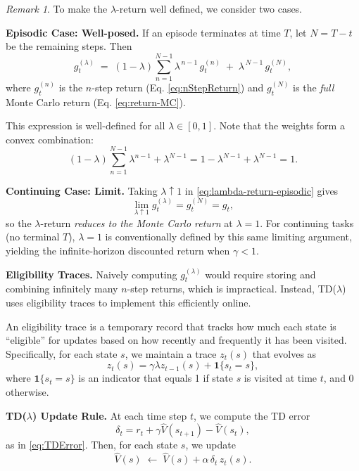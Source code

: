 \documentclass[
]{book}
\theoremstyle{definition}
\theoremstyle{definition}
\theoremstyle{definition}
\theoremstyle{definition}
\theoremstyle{remark}
\newtheorem*{remark}{Remark}
\begin{document}
\begin{remark}
To make the \(\lambda\)-return well defined, we consider two cases.

\textbf{Episodic Case: Well-posed.} If an episode terminates at time \(T\), let \(N=T-t\) be the remaining steps. Then
\begin{equation}
g_t^{(\lambda)}
\;=\;
(1-\lambda)\sum_{n=1}^{N-1}\lambda^{\,n-1} \, g_t^{(n)}
\;+\;
\lambda^{\,N-1}\, g_t^{(N)},
\label{eq:lambda-return-episodic}
\end{equation}
where \(g_t^{(n)}\) is the \(n\)-step return (Eq. \eqref{eq:nStepReturn}) and \(g_t^{(N)}\) is the \emph{full} Monte Carlo return (Eq. \eqref{eq:return-MC}).

This expression is well-defined for all \(\lambda\in[0,1]\). Note that the weights form a convex combination:
\[
(1-\lambda)\sum_{n=1}^{N-1}\lambda^{n-1} + \lambda^{N-1}
= 1-\lambda^{N-1}+\lambda^{N-1} = 1.
\]

\textbf{Continuing Case: Limit.} Taking \(\lambda\uparrow 1\) in \eqref{eq:lambda-return-episodic} gives
\[
\lim_{\lambda\uparrow 1} g_t^{(\lambda)}
= g_t^{(N)} = g_t,
\]
so the \(\lambda\)-return \emph{reduces to the Monte Carlo return} at \(\lambda=1\). For continuing tasks (no terminal \(T\)), \(\lambda=1\) is conventionally defined by this same limiting argument, yielding the infinite-horizon discounted return when \(\gamma<1\).
\end{remark}

\textbf{Eligibility Traces.} Naively computing \(g_t^{(\lambda)}\) would require storing and combining infinitely many \(n\)-step returns, which is impractical. Instead, TD(\(\lambda\)) uses eligibility traces to implement this efficiently online.

An eligibility trace is a temporary record that tracks how much each state is ``eligible'' for updates based on how recently and frequently it has been visited. Specifically, for each state \(s\), we maintain a trace \(z_t(s)\) that evolves as
\begin{equation}
z_t(s) = \gamma \lambda z_{t-1}(s) + \mathbf{1}\{s_t = s\},
\label{eq:EligibilityTrace}
\end{equation}
where \(\mathbf{1}\{s_t = s\}\) is an indicator that equals 1 if state \(s\) is visited at time \(t\), and 0 otherwise.

\textbf{TD(\(\lambda\)) Update Rule.} At each time step \(t\), we compute the TD error
\[
\delta_t = r_t + \gamma \hat{V}(s_{t+1}) - \hat{V}(s_t),
\]
as in \eqref{eq:TDError}. Then, for each state \(s\), we update
\begin{equation}
\hat{V}(s) \;\leftarrow\; \hat{V}(s) + \alpha \, \delta_t \, z_t(s).
\label{eq:TDLambdaUpdate}
\end{equation}
\end{document}

